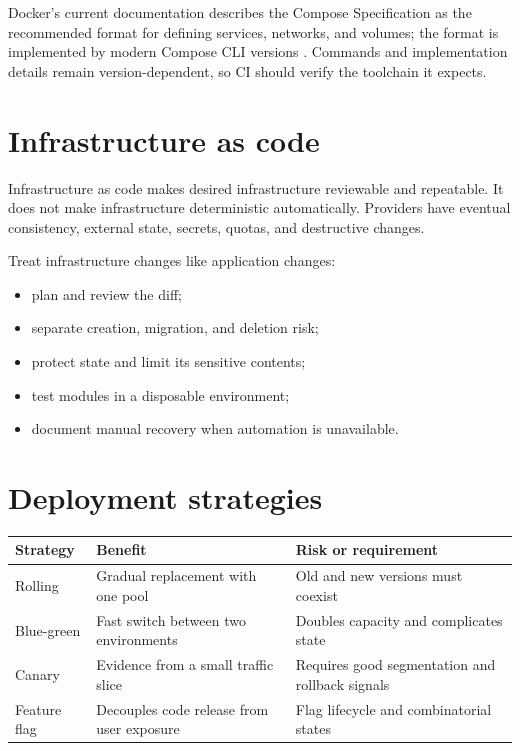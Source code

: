 Docker's current documentation describes the Compose Specification as the
recommended format for defining services, networks, and volumes; the format is
implemented by modern Compose CLI versions \cite{docker2026compose}. Commands
and implementation details remain version-dependent, so CI should verify the
toolchain it expects.

\section{Infrastructure as code}
Infrastructure as code makes desired infrastructure reviewable and repeatable.
It does not make infrastructure deterministic automatically. Providers have
eventual consistency, external state, secrets, quotas, and destructive changes.

Treat infrastructure changes like application changes:

\begin{itemize}
  \item plan and review the diff;
  \item separate creation, migration, and deletion risk;
  \item protect state and limit its sensitive contents;
  \item test modules in a disposable environment;
  \item document manual recovery when automation is unavailable.
\end{itemize}

\section{Deployment strategies}
\noindent\begin{tabularx}{\textwidth}{@{}p{}p{}X@{}}
\toprule
Strategy & Benefit & Risk or requirement \\
\midrule
Rolling & Gradual replacement with one pool & Old and new versions must coexist \\
Blue-green & Fast switch between two environments & Doubles capacity and complicates state \\
Canary & Evidence from a small traffic slice & Requires good segmentation and rollback signals \\
Feature flag & Decouples code release from user exposure & Flag lifecycle and combinatorial states \\
\bottomrule
\end{tabularx}

